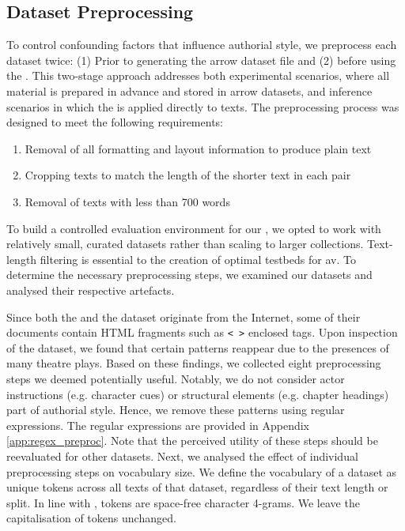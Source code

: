 \subsection{Dataset Preprocessing}
\label{subsec:dataset_preprocessing}

To control confounding factors that influence authorial style, we preprocess each dataset twice:
(1) Prior to generating the arrow dataset file and (2) before using the \impAppr{}.
This two-stage approach addresses both experimental scenarios, where all material is prepared in advance and stored in arrow datasets, and inference scenarios in which the \impAppr{} is applied directly to texts.
The preprocessing process was designed to meet the following requirements:
\begin{enumerate}
    \item Removal of all formatting and layout information to produce plain text
    \item Cropping texts to match the length of the shorter text in each pair
    \item Removal of texts with less than 700 words
\end{enumerate}
To build a controlled evaluation environment for our \impAppr{}, we opted to work with relatively small, curated datasets rather than scaling to larger collections.  
Text-length filtering is essential to the creation of optimal testbeds for \ac{av}.
To determine the necessary preprocessing steps, we examined our datasets and analysed their respective artefacts.

Since both the \dataBlog{} and the \dataPan{} dataset originate from the Internet, some of their documents contain HTML fragments such as \texttt{< >} enclosed tags.
Upon inspection of the \dataGutenberg{} dataset, we found that certain patterns reappear due to the presences of many theatre plays.
Based on these findings, we collected eight preprocessing steps we deemed potentially useful. 
Notably, we do not consider actor instructions (e.g. character cues) or structural elements (e.g. chapter headings) part of authorial style.
Hence, we remove these patterns using regular expressions.
The regular expressions are provided in Appendix \ref{app:regex_preproc}.
Note that the perceived utility of these steps should be reevaluated for other datasets.
Next, we analysed the effect of individual preprocessing steps on vocabulary size.  
We define the vocabulary of a dataset as unique tokens across all texts of that dataset, regardless of their text length or split.
In line with \citep{koppel_determining_2014}, tokens are space-free character 4-grams.
We leave the capitalisation of tokens unchanged. 

